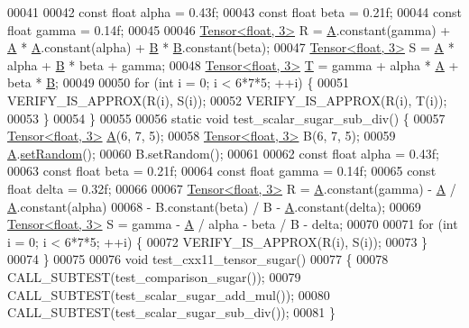 \begin{DoxyCode}
00041 
00042   \textcolor{keyword}{const} \textcolor{keywordtype}{float} alpha = 0.43f;
00043   \textcolor{keyword}{const} \textcolor{keywordtype}{float} beta = 0.21f;
00044   \textcolor{keyword}{const} \textcolor{keywordtype}{float} gamma = 0.14f;
00045 
00046   \hyperlink{class_eigen_1_1_tensor}{Tensor<float, 3>} R = \hyperlink{group___core___module_class_eigen_1_1_matrix}{A}.constant(gamma) + \hyperlink{group___core___module_class_eigen_1_1_matrix}{A} * \hyperlink{group___core___module_class_eigen_1_1_matrix}{A}.constant(alpha) + 
      \hyperlink{group___core___module_class_eigen_1_1_matrix}{B} * \hyperlink{group___core___module_class_eigen_1_1_matrix}{B}.constant(beta);
00047   \hyperlink{class_eigen_1_1_tensor}{Tensor<float, 3>} S = \hyperlink{group___core___module_class_eigen_1_1_matrix}{A} * alpha + \hyperlink{group___core___module_class_eigen_1_1_matrix}{B} * beta + gamma;
00048   \hyperlink{class_eigen_1_1_tensor}{Tensor<float, 3>} \hyperlink{group___sparse_core___module}{T} = gamma + alpha * \hyperlink{group___core___module_class_eigen_1_1_matrix}{A} + beta * \hyperlink{group___core___module_class_eigen_1_1_matrix}{B};
00049 
00050   \textcolor{keywordflow}{for} (\textcolor{keywordtype}{int} i = 0; i < 6*7*5; ++i) \{
00051     VERIFY\_IS\_APPROX(R(i), S(i));
00052     VERIFY\_IS\_APPROX(R(i), T(i));
00053   \}
00054 \}
00055 
00056 \textcolor{keyword}{static} \textcolor{keywordtype}{void} test\_scalar\_sugar\_sub\_div() \{
00057   \hyperlink{class_eigen_1_1_tensor}{Tensor<float, 3>} \hyperlink{group___core___module_class_eigen_1_1_matrix}{A}(6, 7, 5);
00058   \hyperlink{class_eigen_1_1_tensor}{Tensor<float, 3>} B(6, 7, 5);
00059   \hyperlink{group___core___module_class_eigen_1_1_matrix}{A}.\hyperlink{class_eigen_1_1_plain_object_base_af0e576a0e1aefc9ee346de44cc352ba3}{setRandom}();
00060   B.setRandom();
00061 
00062   \textcolor{keyword}{const} \textcolor{keywordtype}{float} alpha = 0.43f;
00063   \textcolor{keyword}{const} \textcolor{keywordtype}{float} beta = 0.21f;
00064   \textcolor{keyword}{const} \textcolor{keywordtype}{float} gamma = 0.14f;
00065   \textcolor{keyword}{const} \textcolor{keywordtype}{float} delta = 0.32f;
00066 
00067   \hyperlink{class_eigen_1_1_tensor}{Tensor<float, 3>} R = \hyperlink{group___core___module_class_eigen_1_1_matrix}{A}.constant(gamma) - \hyperlink{group___core___module_class_eigen_1_1_matrix}{A} / \hyperlink{group___core___module_class_eigen_1_1_matrix}{A}.constant(alpha)
00068       - B.constant(beta) / B - \hyperlink{group___core___module_class_eigen_1_1_matrix}{A}.constant(delta);
00069   \hyperlink{class_eigen_1_1_tensor}{Tensor<float, 3>} S = gamma - \hyperlink{group___core___module_class_eigen_1_1_matrix}{A} / alpha - beta / B - delta;
00070 
00071   \textcolor{keywordflow}{for} (\textcolor{keywordtype}{int} i = 0; i < 6*7*5; ++i) \{
00072     VERIFY\_IS\_APPROX(R(i), S(i));
00073   \}
00074 \}
00075 
00076 \textcolor{keywordtype}{void} test\_cxx11\_tensor\_sugar()
00077 \{
00078   CALL\_SUBTEST(test\_comparison\_sugar());
00079   CALL\_SUBTEST(test\_scalar\_sugar\_add\_mul());
00080   CALL\_SUBTEST(test\_scalar\_sugar\_sub\_div());
00081 \}
\end{DoxyCode}
